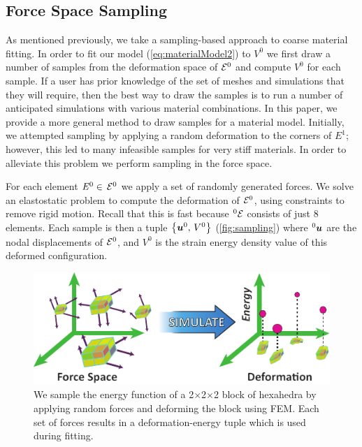 \subsection{Force Space Sampling}
\label{sec:force_space_sampling}
As mentioned previously, we take a sampling-based approach to coarse material fitting. In order to fit our model (\autoref{eq:materialModel2}) to $V^0$ we first draw a number of samples from the deformation space of $\mathcal{E}^0$ and compute $V^0$ for each sample.
If a user has prior knowledge of the set of meshes and simulations that they will require, then the best way to draw the samples is to run a number of anticipated simulations with various material combinations.
In this paper, we provide a more general method to draw samples for a material model.
Initially, we attempted sampling by applying a random deformation to the corners of $\mathit{E}^1$; however, this led to many infeasible samples for very stiff materials.
In order to alleviate this problem we perform sampling in the force space.

For each element $\mathit{E}^0\in \, \mathcal{E}^0$ we apply a set of randomly generated forces.
We solve an elastostatic problem to compute the deformation of $\mathcal{E}^0$, using constraints to remove rigid motion. Recall that this is fast because $^0\mathcal{E}$ consists of just 8 elements.
Each sample is then a tuple $\left\{\bm{u}^0, \, V^0\right\}$ (\autoref{fig:sampling}) 
where $^0\bm{u}$ are the nodal displacements of $\mathcal{E}^0$,
and $V^0$ is the strain energy density value of this deformed configuration.
\begin{figure}
	\centering
	\includegraphics[width=0.6\columnwidth]{images/sampling.pdf}
	\caption{ We sample the energy function of a 2$\times$2$\times$2 block of hexahedra by applying random forces and deforming the block using FEM. Each set of forces results in a deformation-energy tuple which is used during fitting.}
	\label{fig:sampling}
\end{figure}

